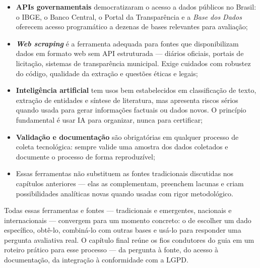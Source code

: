 \begin{itemize}
  \item \textbf{APIs governamentais} democratizaram o acesso a dados públicos no Brasil: o IBGE, o Banco Central, o Portal da Transparência e a \textit{Base dos Dados} oferecem acesso programático a dezenas de bases relevantes para avaliação;

  \item \textbf{\textit{Web scraping}} é a ferramenta adequada para fontes que disponibilizam dados em formato web sem API estruturada --- diários oficiais, portais de licitação, sistemas de transparência municipal. Exige cuidados com robustez do código, qualidade da extração e questões éticas e legais;

  \item \textbf{Inteligência artificial} tem usos bem estabelecidos em classificação de texto, extração de entidades e síntese de literatura, mas apresenta riscos sérios quando usada para gerar informações factuais ou dados novos. O princípio fundamental é usar IA para organizar, nunca para certificar;

  \item \textbf{Validação e documentação} são obrigatórias em qualquer processo de coleta tecnológica: sempre valide uma amostra dos dados coletados e documente o processo de forma reproduzível;

  \item Essas ferramentas não substituem as fontes tradicionais discutidas nos capítulos anteriores --- elas as complementam, preenchem lacunas e criam possibilidades analíticas novas quando usadas com rigor metodológico.
\end{itemize}

\medskip

Todas essas ferramentas e fontes --- tradicionais e emergentes, nacionais e internacionais --- convergem para um momento concreto: o de escolher um dado específico, obtê-lo, combiná-lo com outras bases e usá-lo para responder uma pergunta avaliativa real. O capítulo final reúne os fios condutores do guia em um roteiro prático para esse processo --- da pergunta à fonte, do acesso à documentação, da integração à conformidade com a LGPD.